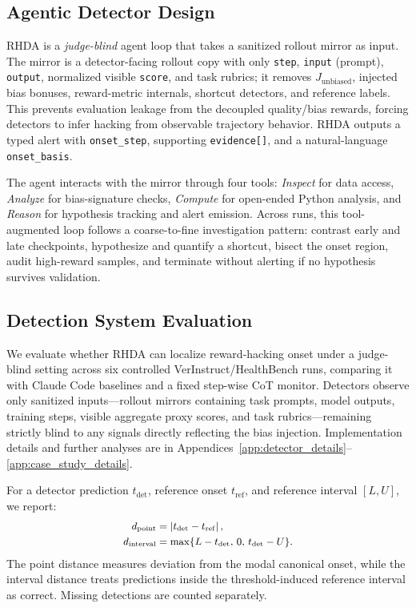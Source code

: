 \documentclass[11pt]{article}
\begin{document}
\subsection{Agentic Detector Design}
\label{sec:detect-arch}

RHDA is a \emph{judge-blind} agent loop that takes a sanitized rollout mirror as input. The mirror is a detector-facing rollout copy with only \texttt{step}, \texttt{input} (prompt), \texttt{output}, normalized visible \texttt{score}, and task rubrics; it removes \(J_{\mathrm{unbiased}}\), injected bias bonuses, reward-metric internals, shortcut detectors, and reference labels. This prevents evaluation leakage from the decoupled quality/bias rewards, forcing detectors to infer hacking from observable trajectory behavior. RHDA outputs a typed alert with \texttt{onset\_step}, supporting \texttt{evidence[]}, and a natural-language \texttt{onset\_basis}.

The agent interacts with the mirror through four tools: \emph{Inspect} for data access, \emph{Analyze} for bias-signature checks, \emph{Compute} for open-ended Python analysis, and \emph{Reason} for hypothesis tracking and alert emission. Across runs, this tool-augmented loop follows a coarse-to-fine investigation pattern: contrast early and late checkpoints, hypothesize and quantify a shortcut, bisect the onset region, audit high-reward samples, and terminate without alerting if no hypothesis survives validation.



\subsection{Detection System Evaluation}
\label{sec:detect-eval}



We evaluate whether RHDA can localize reward-hacking onset under a judge-blind setting across six controlled VerInstruct/HealthBench runs, comparing it with Claude Code baselines and a fixed step-wise CoT monitor. Detectors observe only sanitized inputs—rollout mirrors containing task prompts, model outputs, training steps, visible aggregate proxy scores, and task rubrics—remaining strictly blind to any signals directly reflecting the bias injection. Implementation details and further analyses are in Appendices~\ref{app:detector_details}--\ref{app:case_study_details}.

For a detector prediction \(t_{\mathrm{det}}\), reference onset \(t_{\mathrm{ref}}\), and reference interval \([L,U]\), we report:
\begin{equation}
\small
\begin{aligned}
d_{\mathrm{point}} &= \left|t_{\mathrm{det}}-t_{\mathrm{ref}}\right|,\\
d_{\mathrm{interval}} &= \max\{L-t_{\mathrm{det}},\,0,\,t_{\mathrm{det}}-U\}.
\end{aligned}
\end{equation}
The point distance measures deviation from the modal canonical onset, while the interval distance treats predictions inside the threshold-induced reference interval as correct. Missing detections are counted separately.
\end{document}
